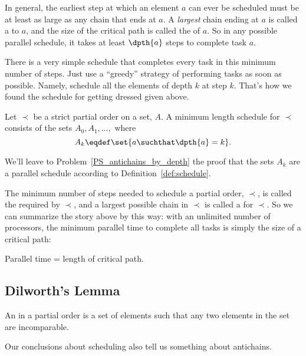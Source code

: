 In general, the earliest step at which an element $a$ can ever be
scheduled must be at least as large as any chain that ends at $a$.  A
\emph{largest} chain ending at $a$ is called a  to
$a$, and the size of the critical path is called the  of
$a$.  So in any possible parallel schedule, it takes at least
$\dpth{a}$ steps to complete task $a$.

There is a very simple schedule that completes every task in this
minimum number of steps.  Just use a ``greedy'' strategy of performing
tasks as soon as possible.  Namely, schedule all the elements of depth
$k$ at step $k$.  That's how we found the schedule for getting dressed
given above.

\begin{theorem}\label{thm:parallel-time}
Let $\prec$ be a strict partial order on a set, $A$.  A minimum length
schedule for $\prec$ consists of the sets $A_0, A_1,\dots,$
where
\[
A_k \eqdef \set{a \suchthat \dpth{a} =k}.
\]
\end{theorem}

We'll leave to Problem~\ref{PS_antichains_by_depth} the proof that the
sets $A_k$ are a parallel schedule according to
Definition~\ref{def:schedule}.

The minimum number of steps needed to schedule a partial order,
$\prec$, is called the  required by $\prec$, and a
largest possible chain in $\prec$ is called a  for
$\prec$.  So we can summarize the story above by this way: with an
unlimited number of processors, the minimum parallel time to complete
all tasks is simply the size of a critical path:

\begin{corollary}\label{cor:critical-path-time}
Parallel time = length of critical path.
\end{corollary}

\subsection{Dilworth's Lemma}\label{dilworth_subsec}

\begin{definition}
An  in a partial order is a set of elements such that any
two elements in the set are incomparable.
\end{definition}

Our conclusions about scheduling also tell us something about antichains.

